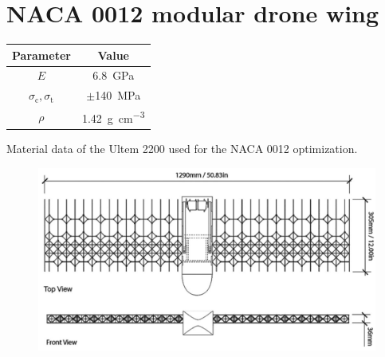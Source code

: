 \section{NACA 0012 modular drone wing} \label{sec:07_wing}
\begin{margintable}
    \small
    \centering
    \begin{tabular}{cc}
    \toprule
    \textbf{Parameter}        & \textbf{Value} \\ \midrule
    $E$              & \qty{6.8}{GPa}     \\
    $\sigma_\text{c}, \sigma_\text{t}$ & $\pm $\qty{140}{MPa} \\
    $\rho$              & \qty{1.42}{\gram\per\cubic\centi\metre}   \\
    \bottomrule
    \end{tabular}
    \caption{Material data of the Ultem 2200 used for the NACA 0012 optimization.}
    \label{tab:07_NACA_mat}
\end{margintable}
\begin{figure}
    \centering
    \includegraphics[width=0.8\linewidth]{figures/07_aeronautic/naca0012.png}
        \caption{ \cite{jenett_digital_2017}}
    \label{fig:07_naca0012}
\end{figure}
